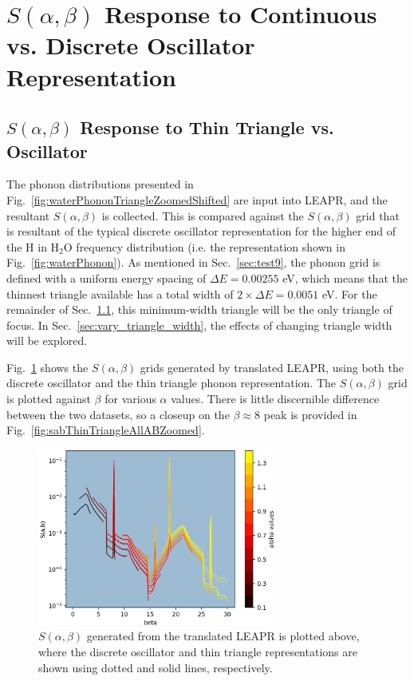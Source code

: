 \documentclass[Master.tex]{subfiles}
\begin{document}
\section{$S(\alpha,\beta)$ Response to Continuous vs. Discrete Oscillator Representation} 

  \subsection{$S(\alpha,\beta)$ Response to Thin Triangle vs. Oscillator}\label{sec:thin_triangle_vs_delta}
    The phonon distributions presented in Fig.~\ref{fig:waterPhononTriangleZoomedShifted} are input into LEAPR, and the resultant $S(\alpha,\beta)$ is collected. This is compared against the $S(\alpha,\beta)$ grid that is resultant of the typical discrete oscillator representation for the higher end of the H in H$_2$O frequency distribution (i.e. the representation shown in Fig.~\ref{fig:waterPhonon}). As mentioned in Sec.~\ref{sec:test9}, the phonon grid is defined with a uniform energy spacing of $\Delta E=0.00255$  eV, which means that the thinnest triangle available has a total width of $2\times\Delta E=0.0051$ eV. For the remainder of Sec.~\ref{sec:thin_triangle_vs_delta}, this minimum-width triangle will be the only triangle of focus. In Sec.~\ref{sec:vary_triangle_width}, the effects of changing triangle width will be explored.

    Fig.~\ref{fig:sabThinTriangleAllAB} shows the $S(\alpha,\beta)$ grids generated by translated LEAPR, using both the discrete oscillator and the thin triangle phonon representation. The $S(\alpha,\beta)$ grid is plotted against $\beta$ for various $\alpha$ values. There is little discernible difference between the two datasets, so a closeup on the $\beta\approx8$ peak is provided in Fig.~\ref{fig:sabThinTriangleAllABZoomed}.

    \begin{figure}[h]
      \begin{center}
        \includegraphics[width=0.7\textwidth]{sab_thinTriangle_and_delta_all_ABb}
        \caption[$S(\alpha,\beta)$ grid, comparing oscillator vs. thin triangle representation (translated LEAPR used)]{$S(\alpha,\beta)$ generated from the translated LEAPR is plotted above, where the discrete oscillator and thin triangle representations are shown using dotted and solid lines, respectively.}
        \label{fig:sabThinTriangleAllAB}
      \end{center}
    \end{figure}
\end{document}
